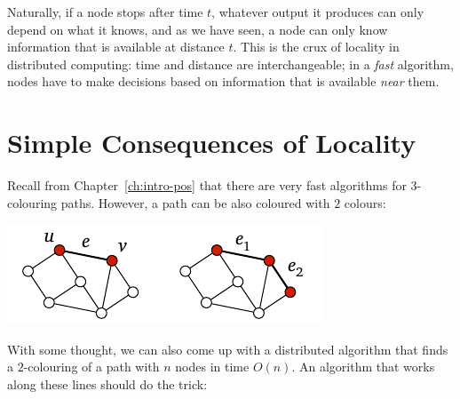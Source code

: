 Naturally, if a node stops after time $t$, whatever output it produces can only depend on what it knows, and as we have seen, a node can only know information that is available at distance $t$. This is the crux of locality in distributed computing: time and distance are interchangeable; in a \emph{fast} algorithm, nodes have to make decisions based on information that is available \emph{near} them.

\section{Simple Consequences of Locality}\label{sec:intro-neg-simple}

Recall from Chapter~\ref{ch:intro-pos} that there are very fast algorithms for $3$-colouring paths. However, a path can be also coloured with $2$ colours:
\begin{center}
    \includegraphics[page=\PIntroColTwo]{figs.pdf}
\end{center}
With some thought, we can also come up with a distributed algorithm that finds a $2$-colouring of a path with $n$ nodes in time $O(n)$. An algorithm that works along these lines should do the trick:
